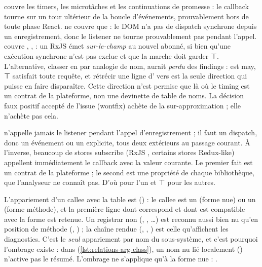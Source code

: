 \begin{decision}
 couvre les timers, les microtâches et les continuations de promesse : le callback tourne sur un tour ultérieur de la boucle d'événements, prouvablement hors de toute phase React.  ne couvre que  : le DOM n'a pas de dispatch synchrone depuis un enregistrement, donc le listener ne tourne prouvablement pas pendant l'appel.  couvre , ,  : un  RxJS émet \emph{sur-le-champ} au nouvel abonné, si bien qu'une exécution synchrone n'est pas exclue et que la marche doit garder ⊤. L'alternative, classer  en  par analogie de nom, aurait \emph{perdu} des findings :  est may, ⊤ satisfait toute requête, et rétrécir une ligne d' vers  est la seule direction qui puisse en faire disparaître. Cette direction n'est permise que là où le timing est un contrat de la plateforme, non une devinette de table de noms. La décision \og faux positif accepté\fg{} de l'issue  (wontfix) achète de la sur-approximation ; elle n'achète pas cela.
\end{decision}

\begin{react}
 n'appelle jamais le listener pendant l'appel d'enregistrement ; il faut un dispatch, donc un événement ou un  explicite, tous deux extérieurs au passage courant. À l'inverse, beaucoup de stores \og subscribe\fg{} (RxJS , certains stores Redux-like) appellent immédiatement le callback avec la valeur courante. Le premier fait est un contrat de la plateforme ; le second est une propriété de chaque bibliothèque, que l'analyseur ne connaît pas. D'où  pour l'un et ⊤ pour les autres.
\end{react}

L'appariement d'un callee avec la table est  () : le callee est un  (forme nue) ou un  (forme méthode), et la première ligne dont  correspond et dont  est compatible avec la forme est retenue. Un registrar non  (, , \dots) est reconnu aussi bien nu qu'en position de méthode (, ) ; la chaîne  rendue (, , ) est celle qu'affichent les diagnostics. C'est le \emph{seul} appariement par nom du sous-système, et c'est pourquoi l'ombrage existe : dans  (\cref{lst:relations-arg-class}), un nom nu lié localement () n'active pas le résumé. L'ombrage ne s'applique qu'à la forme nue : .

